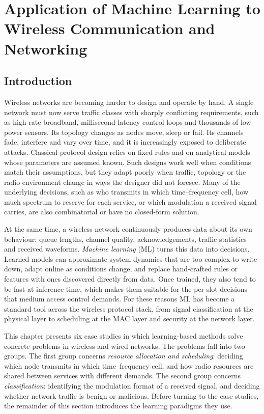 \chapter{Application of Machine Learning to Wireless Communication and Networking}
\label{sec:chapter_ml}

\section{Introduction}
\label{sec:ml_intro}

Wireless networks are becoming harder to design and operate by hand. A single network must now serve traffic classes with sharply conflicting requirements, such as high-rate broadband, millisecond-latency control loops and thousands of low-power sensors. Its topology changes as nodes move, sleep or fail. Its channels fade, interfere and vary over time, and it is increasingly exposed to deliberate attacks. Classical protocol design relies on fixed rules and on analytical models whose parameters are assumed known. Such designs work well when conditions match their assumptions, but they adapt poorly when traffic, topology or the radio environment change in ways the designer did not foresee. Many of the underlying decisions, such as who transmits in which time--frequency cell, how much spectrum to reserve for each service, or which modulation a received signal carries, are also combinatorial or have no closed-form solution.

At the same time, a wireless network continuously produces data about its own behaviour: queue lengths, channel quality, acknowledgements, traffic statistics and received waveforms. \emph{Machine learning} (ML) turns this data into decisions. Learned models can approximate system dynamics that are too complex to write down, adapt online as conditions change, and replace hand-crafted rules or features with ones discovered directly from data. Once trained, they also tend to be fast at inference time, which makes them suitable for the per-slot decisions that medium access control demands. For these reasons ML has become a standard tool across the wireless protocol stack, from signal classification at the physical layer to scheduling at the MAC layer and security at the network layer.

This chapter presents six case studies in which learning-based methods solve concrete problems in wireless and wired networks. The problems fall into two groups. The first group concerns \emph{resource allocation and scheduling}: deciding which node transmits in which time--frequency cell, and how radio resources are shared between services with different demands. The second group concerns \emph{classification}: identifying the modulation format of a received signal, and deciding whether network traffic is benign or malicious. Before turning to the case studies, the remainder of this section introduces the learning paradigms they use.

